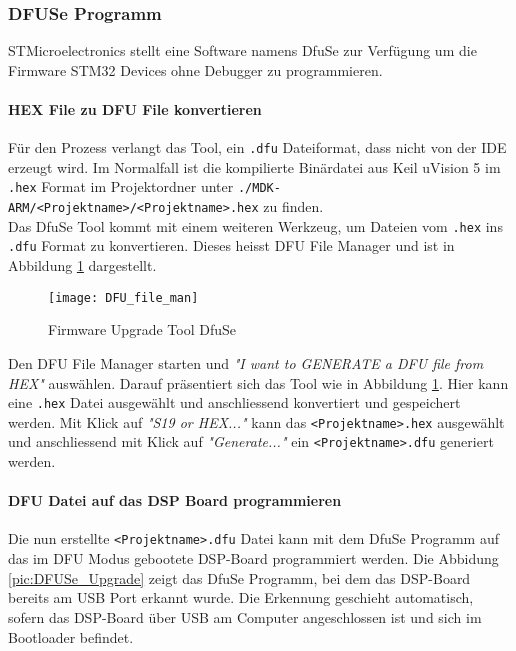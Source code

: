 \subsubsection{DFUSe Programm}
\label{sec:DFUSe}

STMicroelectronics stellt eine Software namens DfuSe zur Verfügung um die Firmware STM32 Devices ohne Debugger zu programmieren.

\paragraph{HEX File zu DFU File konvertieren}

Für den Prozess verlangt das Tool, ein \texttt{.dfu} Dateiformat, dass nicht von der IDE erzeugt wird. 
Im Normalfall ist die kompilierte Binärdatei aus Keil uVision 5 im \texttt{.hex} Format im Projektordner unter \texttt{./MDK-ARM/<Projektname>/<Projektname>.hex} zu finden.\\

Das DfuSe Tool kommt mit einem weiteren Werkzeug, um Dateien vom \texttt{.hex} ins \texttt{.dfu} Format zu konvertieren. 
Dieses heisst DFU File Manager und ist in Abbildung \ref{pic:DFU_file_man} dargestellt.

\begin{figure}[H]
	\centering
	\texttt{[image: DFU\_file\_man]}
	\caption{Firmware Upgrade Tool DfuSe}
	\label{pic:DFU_file_man}
\end{figure}

Den DFU File Manager starten und \textit{"I want to GENERATE a DFU file from HEX"} auswählen.
Darauf präsentiert sich das Tool wie in Abbildung \ref{pic:DFU_file_man}. Hier kann eine \texttt{.hex} Datei ausgewählt und anschliessend konvertiert und gespeichert werden.
Mit Klick auf \textit{"S19 or HEX..."} kann das \texttt{<Projektname>.hex} ausgewählt und anschliessend mit Klick auf \textit{"Generate..."} ein \texttt{<Projektname>.dfu} generiert werden.

\paragraph{DFU Datei auf das DSP Board programmieren}

Die nun erstellte \texttt{<Projektname>.dfu} Datei kann mit dem DfuSe Programm auf das im DFU Modus gebootete DSP-Board programmiert werden. 
Die Abbidung \ref{pic:DFUSe_Upgrade} zeigt das DfuSe Programm, bei dem das DSP-Board bereits am USB Port erkannt wurde. Die Erkennung geschieht automatisch, sofern das DSP-Board über USB am Computer angeschlossen ist und sich im Bootloader befindet.

